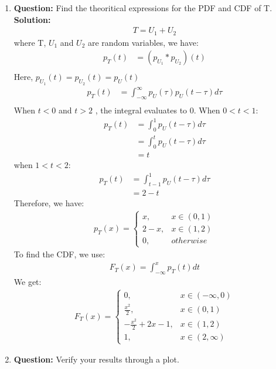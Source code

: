 \documentclass[journal,12pt,twocolumn]{IEEEtran}
\begin{document}
\begin{enumerate}[label=\thesection.\arabic*
,ref=\thesection.\theenumi]
\item\textbf{Question: } Find the theoritical expressions for the PDF and CDF of T.\\
    \textbf{Solution: }\\
    \begin{align}
    T = U_1 + U_2
\end{align}
where T, $U_1$ and $U_2$ are random variables, we have:
\begin{align}
    p_T(t) &= (p_{U_1} * p_{U_2})(t) \\
\end{align}
        Here, $p_{U_1}(t) = p_{U_2}(t) = p_U(t) $
\begin{align}
    p_T(t) &= \int _{-\infty} ^{\infty} p_U(\tau) p_U(t-\tau) d\tau \\
\end{align}
When $t < 0$ and $t > 2$ , the integral evaluates to $0$. When $0 < t < 1$:
\begin{align}
    p_T(t)  &= \int _0 ^1 p_U(t-\tau) d\tau \\
    &= \int _0 ^t p_U(t-\tau) d\tau \\
    &= t
\end{align}
when $ 1 < t < 2$:
\begin{align}
    p_T(t) &= \int _{t-1} ^1 p_U(t-\tau) d\tau \\
    &= 2-t
\end{align}
Therefore, we have:
\begin{align}
    p_T(x) =
    \begin{cases}
        x, & x \in (0,1) \\
        2-x, & x \in (1, 2) \\
        0, & otherwise
    \end{cases}
\end{align}
To find the CDF, we use:
\begin{align}
    F_T(x) = \int _{-\infty} ^x p_T(t) dt
\end{align}
We get:
\begin{align}
    F_T(x) =
    \begin{cases}
        0, & x \in (-\infty,0) \\
        \frac{x^2}{2}, & x \in (0,1) \\
        -\frac{x^2}{2} + 2x - 1, & x \in (1, 2) \\
        1, & x \in (2,\infty)
    \end{cases}
\end{align}
\item\textbf{Question: }Verify your results through a plot.\\

\end{enumerate}
\end{document}
